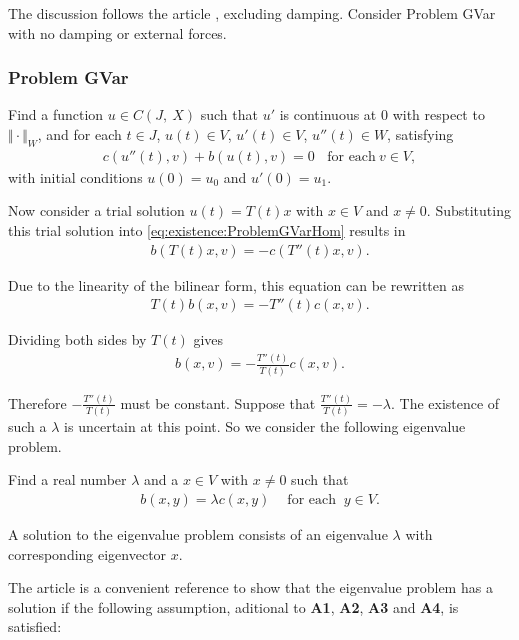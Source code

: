 		The discussion follows the article \cite{CVV18}, excluding damping. Consider Problem GVar with no damping or external forces.

		\subsubsection*{Problem GVar}\label{sssec:existence:ProblemGVar}
		Find a function $u \in C(J,\ X)$ such that $u'$ is continuous at $0$ with respect to $\Vert \cdot \Vert_{W}$, and for each $t \in J$, $u(t) \in V$, $u'(t) \in V$, $u''(t) \in W$, satisfying
		\begin{eqnarray}
		c(u''(t),v)+b(u(t),v) = 0 \ \ \ \ \textrm{for each} \ v \in V, \label{eq:existence:ProblemGVarHom}
		\end{eqnarray}
		with initial conditions $u(0) = u_0$ and $u'(0) = u_1$.

		Now consider a trial solution $u(t) = T(t)x$ with $x \in V$ and $x \neq 0$. Substituting this trial solution into \eqref{eq:existence:ProblemGVarHom} results in
		\begin{eqnarray*}
			b(T(t)x,v) = - c(T''(t)x,v).  \label{eq:existence:ProblemGVarHom:Substitution}
		\end{eqnarray*}

		Due to the linearity of the bilinear form, this equation can be rewritten as
		\begin{eqnarray*}
			T(t)b(x,v) = - T''(t)c(x,v).
		\end{eqnarray*}

		Dividing both sides by $T(t)$ gives
		\begin{eqnarray*}
			b(x,v) = - \frac{T''(t)}{T(t)}c(x,v).
		\end{eqnarray*}

		Therefore $\displaystyle -\frac{T''(t)}{T(t)}$ must be constant. Suppose that $\displaystyle \frac{T''(t)}{T(t)} = -\lambda$. The existence of such a $\lambda$ is uncertain at this point. So we consider the following eigenvalue problem.

		Find a real number $\lambda$ and a $x \in V$ with $x \neq 0$ such that
		\begin{eqnarray*}
			b(x,y) = \lambda c(x,y) \ \ \ \ \textrm{ for each } \ y \in V.
		\end{eqnarray*}

		A solution to the eigenvalue problem consists of an eigenvalue $\lambda$ with corresponding eigenvector $x$. 

		The article \cite{CVV18} is a convenient reference to show that the eigenvalue problem has a solution if the following assumption, aditional to \textbf{A1}, \textbf{A2}, \textbf{A3} and \textbf{A4},  is satisfied:

